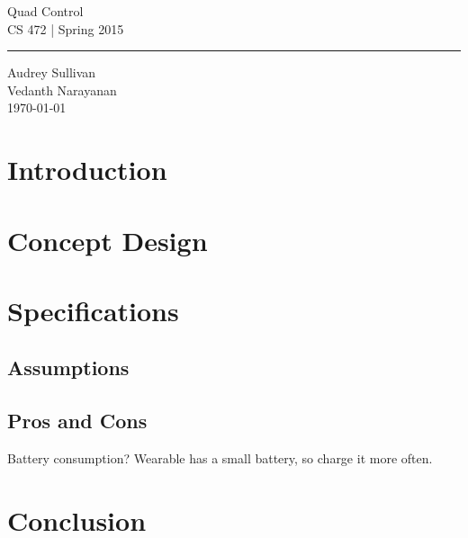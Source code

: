 \documentclass[12pt,letterpaper]{article}
\begin{document}
\begin{titlepage}
    \vspace*{4cm}
    \begin{flushright}
    {\huge
        Quad Control\\[5mm]
    }
    {\large
        CS 472 | Spring 2015
     }
    \end{flushright}
\hrule
    \begin{flushright}
	Audrey Sullivan\\
	Vedanth Narayanan\\
    \vfill
	\today\\
    \end{flushright}
\end{titlepage}

\raggedright

\section*{Introduction}

\section*{Concept Design}

\section*{Specifications}
\subsection*{Assumptions}
\subsection*{Pros and Cons}
Battery consumption?
Wearable has a small battery, so charge it more often.


\section*{Conclusion}

\newpage
\nocite{*}


\end{document}
